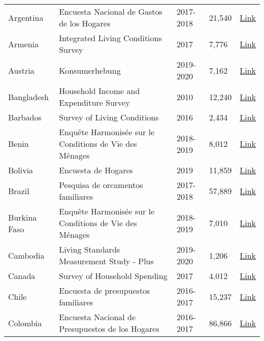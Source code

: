 \begin{ThreePartTable}
\begin{longtable}[t]{l|p{8cm}|l|l|l}
        Argentina & Encuesta Nacional de Gastos de los Hogares & 2017-2018 &  21,540  & \href{https://www.indec.gob.ar/indec/web/Nivel4-Tema-4-45-151}{Link} \\ 
        Armenia & Integrated Living Conditions Survey & 2017 &  7,776  & \href{https://microdata.worldbank.org/index.php/catalog/3591}{Link} \\ 
        Austria & Konsumerhebung & 2019-2020 &  7,162  & \href{https://www.statistik.at/ueber-uns/erhebungen/personen-und-haushaltserhebungen/konsumerhebung}{Link} \\ 
        Bangladesh & Household Income and Expenditure Survey & 2010 &  12,240  & \href{http://data.bbs.gov.bd/index.php/catalog/67}{Link} \\ 
        Barbados & Survey of Living Conditions & 2016 &  2,434  & \href{https://publications.iadb.org/en/barbados-survey-living-conditions-2016}{Link} \\ 
        Benin & Enquête Harmonisée sur le Conditions de Vie des Ménages & 2018-2019 &  8,012  & \href{https://microdata.worldbank.org/index.php/catalog/4291}{Link} \\ 
        Bolivia & Encuesta de Hogares & 2019 &  11,859  & \href{https://www.ine.gob.bo/index.php/estadisticas-sociales/vivienda-y-servicios-basicos/encuestas-de-hogares-vivienda/}{Link} \\ 
        Brazil & Pesquisa de orcamentos familiares & 2017-2018 &  57,889  & \href{https://www.ibge.gov.br/en/statistics/social/population/25610-pof-2017-2018-pof-en.html?=\&t=downloads}{Link} \\ 
        Burkina Faso & Enquête Harmonisée sur le Conditions de Vie des Ménages & 2018-2019 &  7,010  & \href{https://microdata.worldbank.org/index.php/catalog/4290}{Link} \\ 
        Cambodia & Living Standards Measurement Study - Plus & 2019-2020 &  1,206  & \href{https://microdata.worldbank.org/index.php/catalog/study/KHM\_2019\_LSMS-PLUS\_v02\_M}{Link} \\ 
        Canada & Survey of Household Spending & 2017 &  4,012  & \href{https://www150.statcan.gc.ca/n1/en/catalogue/62M0004X}{Link} \\ 
        Chile & Encuesta de presupuestos familiares & 2016-2017 &  15,237  & \href{https://www.ine.cl/estadisticas/sociales/ingresos-y-gastos/encuesta-de-presupuestos-familiares}{Link} \\ 
        Colombia & Encuesta Nacional de Presupuestos de los Hogares & 2016-2017 &  86,866  & \href{https://www.dane.gov.co/index.php/estadisticas-por-tema/pobreza-y-condiciones-de-vida/encuesta-nacional-de-presupuestos-de-los-hogares-enph}{Link} \\ 

\end{longtable}
\end{ThreePartTable}

